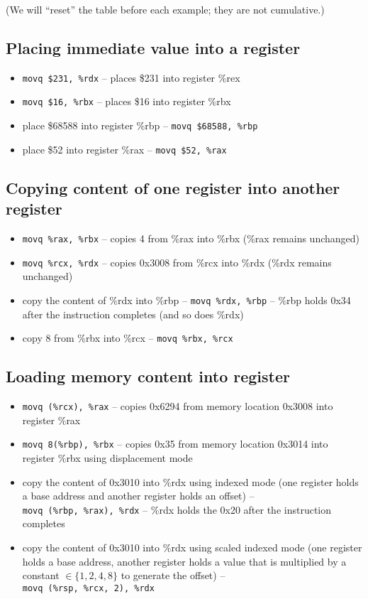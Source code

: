 \documentclass{article}
\begin{document}
(We will ``reset'' the table before each example; they are not cumulative.)


\subsection{Placing immediate value into a register}

\begin{itemize}
\item \texttt{movq \$231, \%rdx} -- places \$231 into register \%rex
\item \texttt{movq \$16, \%rbx} -- places \$16 into register \%rbx
\item place \$68588 into register \%rbp -- \texttt{movq \$68588, \%rbp}
\item place \$52 into register \%rax -- \texttt{movq \$52, \%rax}
\end{itemize}


\subsection{Copying content of one register into another register}

\begin{itemize}
\item \texttt{movq \%rax, \%rbx} -- copies 4 from \%rax into \%rbx (\%rax remains unchanged)
\item \texttt{movq \%rcx, \%rdx} -- copies 0x3008 from \%rcx into \%rdx (\%rdx remains unchanged)
\item copy the content of \%rdx into \%rbp -- \texttt{movq \%rdx, \%rbp} -- \%rbp holds 0x34 after the instruction completes (and so does \%rdx)
\item copy 8 from \%rbx into \%rcx -- \texttt{movq \%rbx, \%rcx}
\end{itemize}


\subsection{Loading memory content into register}

\begin{itemize}
\item \texttt{movq (\%rcx), \%rax} -- copies 0x6294 from memory location 0x3008 into register \%rax
\item \texttt{movq 8(\%rbp), \%rbx} -- copies 0x35 from memory location 0x3014 into register \%rbx using displacement mode
\item copy the content of 0x3010 into \%rdx using indexed mode (one register holds a base address and another register holds an offset) -- \\ \texttt{movq (\%rbp, \%rax), \%rdx} -- \%rdx holds the 0x20 after the instruction completes
\item copy the content of 0x3010 into \%rdx using scaled indexed mode (one register holds a base address, another register holds a value that is multiplied by a constant $\in \{1,2,4,8\}$ to generate the offset) -- \\ \texttt{movq (\%rsp, \%rcx, 2), \%rdx}
\end{itemize}
\end{document}
